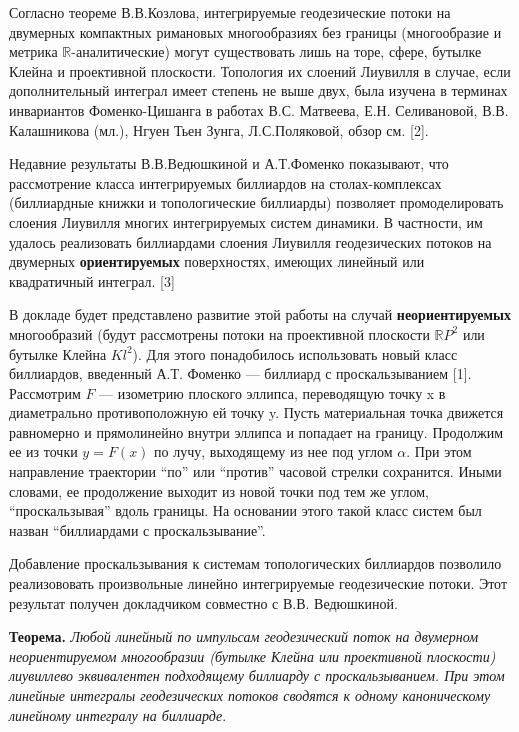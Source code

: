 
\vzmscaption
Согласно теореме В.В.Козлова, интегрируемые геодезические потоки на двумерных компактных римановых многообразиях без границы (многообразие и метрика $\mathbb{R}$-аналитические) могут существовать лишь на торе, сфере, бутылке Клейна и проективной плоскости. Топология их слоений Лиувилля в случае, если дополнительный интеграл имеет степень не выше двух, была изучена в терминах инвариантов Фоменко-Цишанга в работах В.С. Матвеева, Е.Н. Селивановой, В.В. Калашникова (мл.), Нгуен Тьен Зунга, Л.С.Поляковой, обзор см. [2].

Недавние результаты В.В.Ведюшкиной и А.Т.Фоменко показывают, что рассмотрение класса интегрируемых биллиардов на столах-комплексах (биллиардные книжки и топологические биллиарды) позволяет промоделировать слоения Лиувилля многих интегрируемых систем динамики. В частности, им удалось реализовать биллиардами слоения Лиувилля геодезических потоков на двумерных \textbf{ориентируемых} поверхностях, имеющих линейный или квадратичный интеграл. [3]

В докладе будет представлено развитие этой работы на случай \textbf{неориентируемых} многообразий (будут рассмотрены потоки на проективной плоскости $\mathbb{R}P^2$ или бутылке Клейна $Kl^2$). Для этого понадобилось использовать новый класс биллиардов, введенный А.Т. Фоменко — биллиард с проскальзыванием [1]. Рассмотрим $F$ --- изометрию плоского эллипса, переводящую точку x в диаметрально противоположную ей точку y. Пусть материальная точка движется равномерно и прямолинейно внутри эллипса и попадает на границу. Продолжим ее из точки $y=F(x)$ по лучу, выходящему из нее под углом $\alpha$. При этом направление траектории ``по'' или ``против'' часовой стрелки сохранится. Иными словами, ее продолжение выходит из новой точки под тем же углом, ``проскальзывая'' вдоль границы. На основании этого такой класс систем был назван ``биллиардами с проскальзывание''.

Добавление проскальзывания к системам топологических биллиардов позволило реализововать произвольные линейно интегрируемые геодезические потоки. Этот результат получен докладчиком совместно с В.В. Ведюшкиной.

{\bf Теорема.} {\it Любой линейный по импульсам геодезический поток на двумерном неориентируемом многообразии (бутылке Клейна или проективной плоскости) лиувиллево эквивалентен подходящему биллиарду с проскальзыванием. При этом линейные интегралы геодезических потоков сводятся к одному каноническому линейному интегралу на биллиарде}.

